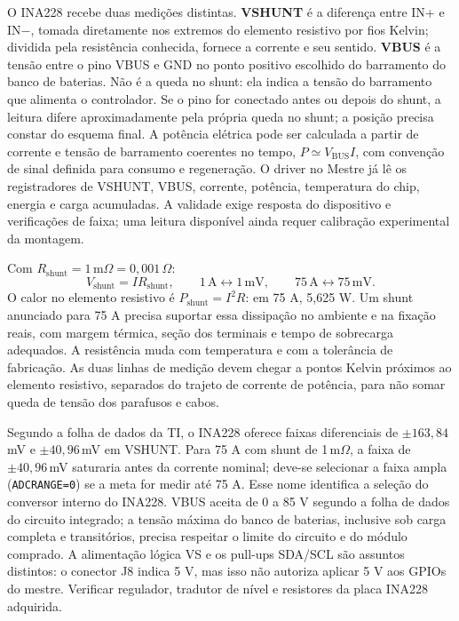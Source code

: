O INA228 recebe duas medições distintas. \textbf{VSHUNT} é a diferença entre IN+ e IN$-$, tomada diretamente nos extremos do elemento resistivo por fios Kelvin; dividida pela resistência conhecida, fornece a corrente e seu sentido. \textbf{VBUS} é a tensão entre o pino VBUS e GND no ponto positivo escolhido do barramento do banco de baterias. Não é a queda no shunt: ela indica a tensão do barramento que alimenta o controlador. Se o pino for conectado antes ou depois do shunt, a leitura difere aproximadamente pela própria queda no shunt; a posição precisa constar do esquema final. A potência elétrica pode ser calculada a partir de corrente e tensão de barramento coerentes no tempo, $P\simeq V_{\mathrm{BUS}}I$, com convenção de sinal definida para consumo e regeneração. O driver no Mestre já lê os registradores de VSHUNT, VBUS, corrente, potência, temperatura do chip, energia e carga acumuladas. A validade exige resposta do dispositivo e verificações de faixa; uma leitura disponível ainda requer calibração experimental da montagem.

Com $R_{\mathrm{shunt}}=1\,\mathrm{m}\Omega=0{,}001\,\Omega$:
\begin{equation}
V_{\mathrm{shunt}}=IR_{\mathrm{shunt}},\qquad
1\,\mathrm{A}\longleftrightarrow 1\,\mathrm{mV},\qquad
75\,\mathrm{A}\longleftrightarrow 75\,\mathrm{mV}.
\label{eq:shunt}
\end{equation}
O calor no elemento resistivo é $P_{\mathrm{shunt}}=I^2R$: em 75 A, 5,625 W. Um shunt anunciado para 75 A precisa suportar essa dissipação no ambiente e na fixação reais, com margem térmica, seção dos terminais e tempo de sobrecarga adequados. A resistência muda com temperatura e com a tolerância de fabricação. As duas linhas de medição devem chegar a pontos Kelvin próximos ao elemento resistivo, separados do trajeto de corrente de potência, para não somar queda de tensão dos parafusos e cabos.

Segundo a folha de dados da TI, o INA228 oferece faixas diferenciais de $\pm163{,}84$\,mV e $\pm40{,}96$\,mV em VSHUNT. Para 75 A com shunt de 1\,m$\Omega$, a faixa de $\pm40{,}96$\,mV saturaria antes da corrente nominal; deve-se selecionar a faixa ampla (\texttt{ADCRANGE=0}) se a meta for medir até 75 A. Esse nome identifica a seleção do conversor interno do INA228. VBUS aceita de 0 a 85 V segundo a folha de dados do circuito integrado; a tensão máxima do banco de baterias, inclusive sob carga completa e transitórios, precisa respeitar o limite do circuito e do módulo comprado. A alimentação lógica VS e os pull-ups SDA/SCL são assuntos distintos: o conector J8 indica 5 V, mas isso não autoriza aplicar 5 V aos GPIOs do mestre. Verificar regulador, tradutor de nível e resistores da placa INA228 adquirida.

